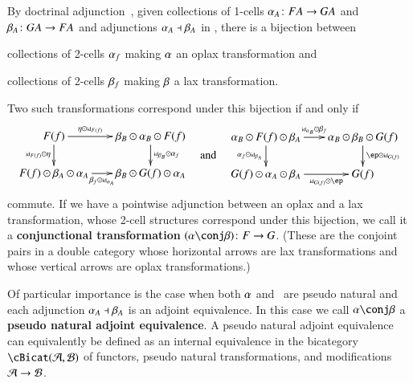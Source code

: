 \documentclass{amsart}
\begin{document}
By doctrinal adjunction~\cite{kelly:doc-adjn}, given collections of
1-cells $\alpha_A\colon FA\to GA$ and $\beta_A\colon GA\to FA$ and
adjunctions $\alpha_A\dashv \beta_A$ in \cB, there is a bijection between
\begin{inparaenum}
\item collections of 2-cells $\alpha_f$ making $\alpha$ an oplax
  transformation and
\item collections of 2-cells $\beta_f$ making $\beta$ a lax
  transformation.
\end{inparaenum}
Two such transformations correspond under this bijection if and only if
\begin{equation}
  \vcenter{\xymatrix@-.5pc{F(f) \ar[r]^-{\eta \odot \mbox{\tiny id}_{F(f)}}
      \ar[d]_{\mbox{\tiny id}_{F(f)}\odot \eta} &
      \be_B\odot \al_B \odot F(f) \ar[d]^{\mbox{\tiny id}_{\be_B} \odot \al_f}\\
      F(f) \odot \be_A\odot \al_A\ar[r]_-{\be_f \odot \mbox{\tiny id}_{\al_A}} &
      \be_B\odot G(f) \odot \al_A}}
  \quad\text{and}\quad
  \vcenter{\xymatrix@-.5pc{\al_B\odot F(f)\odot \be_A
      \ar[r]^-{\mbox{\tiny id}_{\al_B}\odot \be_f}\ar[d]_{\al_f \odot \mbox{\tiny id}_{\be_A}}&
      \al_B \odot \be_B \odot G(f)\ar[d]^{\ep \odot \mbox{\tiny id}_{G(f)}}\\
      G(f)\odot \al_A\odot \be_A \ar[r]_-{\mbox{\tiny id}_{G(f)} \odot \ep} & G(f)}}\label{eq:conjtrans}
\end{equation}
commute.  If we have a pointwise adjunction between an oplax and a lax
transformation, whose 2-cell structures correspond under this
bijection, we call it a \textbf{conjunctional transformation}
$(\al\conj \be)\maps F\to G$.  (These are the conjoint pairs in a
double category whose horizontal arrows are lax transformations and
whose vertical arrows are oplax transformations.)

Of particular importance is the case when both $\alpha$ and \be\ are
pseudo natural and each adjunction $\alpha_A\dashv \beta_A$ is an adjoint
equivalence.  In this case we call $\al\conj \be$ a \textbf{pseudo
  natural adjoint equivalence}.  A pseudo natural adjoint equivalence
can equivalently be defined as an internal equivalence in the
bicategory $\cBicat(\cA,\cB)$ of functors, pseudo natural
transformations, and modifications $\mathcal{A}\to\mathcal{B}$. 
\end{document}
